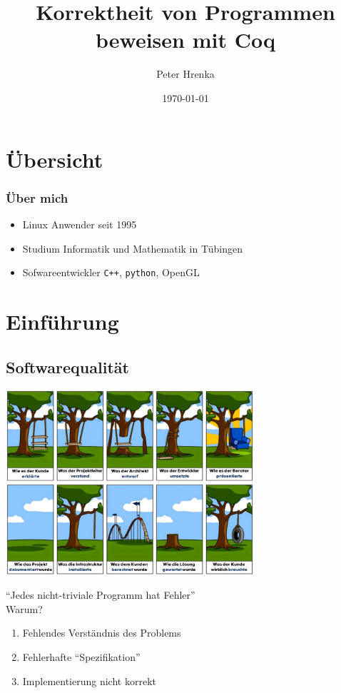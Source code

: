 \documentclass[aspectratio=169]{beamer}
\title{Korrektheit von Programmen beweisen mit Coq}
\institute{Linux Tag Tübingen 2016}
\author{Peter Hrenka}
\date{\today}
\begin{document}
\begin{frame}
\titlepage
\end{frame}
\section*{Übersicht}
\begin{frame}
  \tableofcontents
\end{frame}
\begin{frame}
  \frametitle{Über mich}
  \begin{itemize}
    \item Linux Anwender seit 1995
    \item Studium Informatik und Mathematik in Tübingen
    \item Sofwareentwickler \texttt{C++}, \texttt{python}, OpenGL
  \end{itemize}
\end{frame}
\section{Einführung}
\subsection{Softwarequalität}
\begin{frame}
  \begin{center}
    \includegraphics[width=9.2cm]{projekt-schaukel-baum.png}
  \end{center}
\end{frame}
\begin{frame}
  ``Jedes nicht-triviale Programm hat Fehler''\\
  \pause
  \vfill
  Warum?
  \pause
  \vfill
  \begin{enumerate}
    \item Fehlendes Verständnis des Problems
    \pause
    \item Fehlerhafte ``Spezifikation''
    \pause
    \item Implementierung nicht korrekt
  \end{enumerate}
\end{frame}
\end{document}
